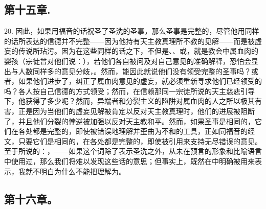 
\subsection{第十五章.}

20. 因此，如果用福音的话祝圣了圣洗的圣事，那么圣事是完整的，尽管他用同样的话所表达的信德并不完整——因为他持有天主教真理所不教的见解——而是被虚妄的传说所玷污。因为在这些同样的话之下，不但是、、或，就是教会中属血肉的婴孩（宗徒曾对他们说：），若他们各自被问及对自己意见的准确解释，恐怕会显出与人数同样多的意见分歧，。然而，能因此就说他们没有领受完整的圣事吗？或者，如果他们进步了，纠正了属血肉意见的虚妄，就必须重新寻求他们已经领受的吗？各人按自己信德的方式领受；然而，在信赖那同一宗徒所说的天主慈悲引导下，他获得了多少呢？然而，异端者和分裂主义的陷阱对属血肉的人之所以极其有害，正是因为当他们的虚妄见解被肯定以反对天主教真理时，他们的进展被阻断了，并且他们分裂的悖逆被加强以反对天主教和平。然而，如果圣事是相同的，它们在各处都是完整的，即使被错误地理解并歪曲为不和的工具，正如同福音的经文，只要它们是相同的，在各处都是完整的，即使被引用来支持无尽错误的意见。至于所说的：，——如果这个词除了表示圣洗之外，从未在预言的形象和比喻语言中使用过，那么我们将难以发现这些话的意思；但事实上，既然在中明确被用来表示，我就不明白为什么不能把理解为。\par


\subsection{第十六章。}

